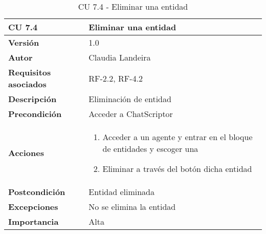 \begin{table}[p]
	\centering
	\begin{tabularx}{\linewidth}{ p{} p{} }
		\toprule
		\textbf{CU 7.4}    & \textbf{Eliminar una entidad}\\
		\toprule
		\textbf{Versión}              & 1.0    \\
		\textbf{Autor}                & Claudia Landeira \\
		\textbf{Requisitos asociados} & RF-2.2, RF-4.2\\
		\textbf{Descripción}          & Eliminación de entidad\\
		\textbf{Precondición}         & Acceder a ChatScriptor\\
		\textbf{Acciones}             &
		\begin{enumerate}
			\def\labelenumi{\arabic{enumi}.}
			\tightlist
                \item Acceder a un agente y entrar en el bloque de entidades y escoger una
                \item Eliminar a través del botón dicha entidad
		\end{enumerate}\\
		\textbf{Postcondición}        & Entidad eliminada  \\
		\textbf{Excepciones}          & No se elimina la entidad \\
		\textbf{Importancia}          & Alta \\
		\bottomrule
	\end{tabularx}
	\caption{CU 7.4 - Eliminar una entidad}
\end{table}

